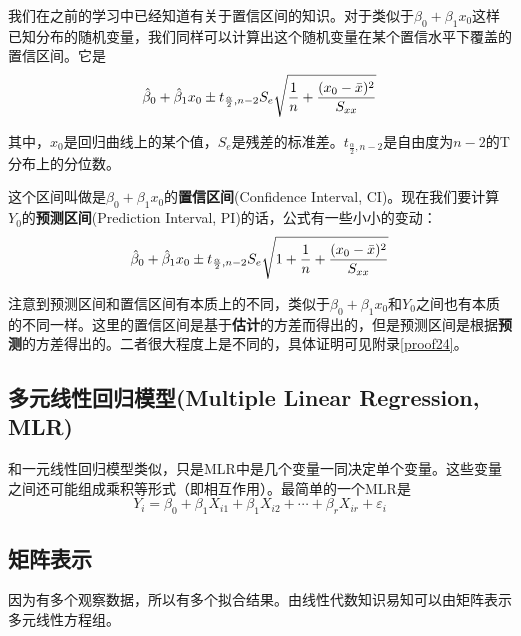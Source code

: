 \documentclass[UTF8]{ctexart}
\begin{document}
我们在之前的学习中已经知道有关于置信区间的知识。对于类似于$\beta_0+\beta_1x_0$这样已知分布的随机变量，我们同样可以计算出这个随机变量在某个置信水平下覆盖的置信区间。它是
\[
\Hat{\beta}_0+\Hat{\beta}_1x_0\pm t_{\frac{\alpha}{2},n-2}S_e\sqrt{\frac{1}{n}+\frac{(x_0-\Bar{x})^2}{S_{xx}}}
\]

其中，$x_0$是回归曲线上的某个值，$S_e$是残差的标准差。$t_{\frac{\alpha}{2},n-2}$是自由度为$n-2$的T分布上的分位数。

这个区间叫做是$\beta_0+\beta_1x_0$的\textbf{置信区间}(Confidence Interval, CI)。现在我们要计算$Y_0$的\textbf{预测区间}(Prediction Interval, PI)的话，公式有一些小小的变动：
\[
\Hat{\beta}_0+\Hat{\beta}_1x_0\pm t_{\frac{\alpha}{2},n-2}S_e\sqrt{1+\frac{1}{n}+\frac{(x_0-\Bar{x})^2}{S_{xx}}}
\]

注意到预测区间和置信区间有本质上的不同，类似于$\beta_0+\beta_1x_0$和$Y_0$之间也有本质的不同一样。这里的置信区间是基于\textbf{估计}的方差而得出的，但是预测区间是根据\textbf{预测}的方差得出的。二者很大程度上是不同的，具体证明可见附录\ref{proof24}。
\subsection{多元线性回归模型(Multiple Linear Regression, MLR)}
和一元线性回归模型类似，只是MLR中是几个变量一同决定单个变量。这些变量之间还可能组成乘积等形式（即相互作用）。最简单的一个MLR是
\[
Y_i=\beta_0+\beta_1X_{i1}+\beta_1X_{i2}+\cdots+\beta_rX_{ir}+\varepsilon_i
\]
\subsection{矩阵表示}
因为有多个观察数据，所以有多个拟合结果。由线性代数知识易知可以由矩阵表示多元线性方程组。
\end{document}
